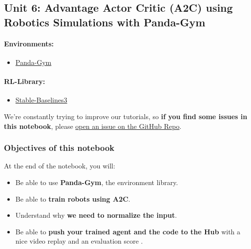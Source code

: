 \documentclass[11pt,a4paper]{article}
\begin{document}
\subsection{Unit 6: Advantage Actor Critic (A2C) using Robotics Simulations with Panda-Gym}\label{unit-6-advantage-actor-critic-a2c-using-robotics-simulations-with-panda-gym}

\paragraph{Environments:}\label{environments}

\begin{itemize}
\tightlist
\item
  \href{https://github.com/qgallouedec/panda-gym}{Panda-Gym}
\end{itemize}

\paragraph{RL-Library:}\label{rl-library}

\begin{itemize}
\tightlist
\item
  \href{https://stable-baselines3.readthedocs.io/}{Stable-Baselines3}
\end{itemize}

We're constantly trying to improve our tutorials, so \textbf{if you find some issues in this notebook}, please \href{https://github.com/huggingface/deep-rl-class/issues}{open an issue on the GitHub Repo}.

\subsubsection{Objectives of this notebook}\label{objectives-of-this-notebook}

At the end of the notebook, you will:

\begin{itemize}
\tightlist
\item
  Be able to use \textbf{Panda-Gym}, the environment library.
\item
  Be able to \textbf{train robots using A2C}.
\item
  Understand why \textbf{we need to normalize the input}.
\item
  Be able to \textbf{push your trained agent and the code to the Hub} with a nice video replay and an evaluation score .
\end{itemize}
\end{document}
